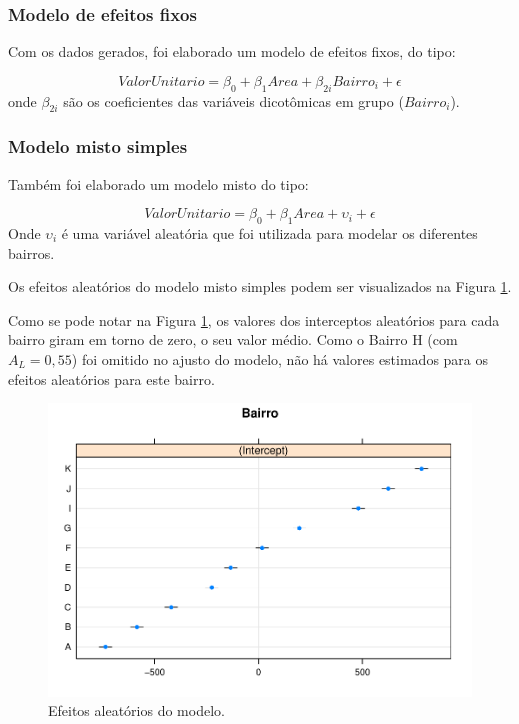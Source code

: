 \documentclass[
  a4paper, 12pt]{article}
\begin{document}
\hypertarget{modelo-de-efeitos-fixos}{%
\subsubsection{Modelo de efeitos fixos}\label{modelo-de-efeitos-fixos}}

Com os dados gerados, foi elaborado um modelo de efeitos fixos, do tipo:

\[ValorUnitario = \beta_0 + \beta_1Area + \beta_{2i}Bairro_i + \epsilon\]
onde \(\beta_{2i}\) são os coeficientes das variáveis dicotômicas em
grupo (\(Bairro_i\)).

\hypertarget{modelo-misto-simples}{%
\subsubsection{Modelo misto simples}\label{modelo-misto-simples}}

Também foi elaborado um modelo misto do tipo:

\[ValorUnitario = \beta_0 + \beta_1Area + \upsilon_i + \epsilon\] Onde
\(\upsilon_i\) é uma variável aleatória que foi utilizada para modelar
os diferentes bairros.

Os efeitos aleatórios do modelo misto simples podem ser visualizados na
Figura \ref{fig:dotplot}.

Como se pode notar na Figura \ref{fig:dotplot}, os valores dos
interceptos aleatórios para cada bairro giram em torno de zero, o seu
valor médio. Como o Bairro H (com \(A_L = 0,55\)) foi omitido no ajusto
do modelo, não há valores estimados para os efeitos aleatórios para este
bairro.

\begin{figure}[H]

{\centering \includegraphics[width=0.7\linewidth]{EstudoCaso_files/figure-latex/dotplot-1} 

}

\caption{Efeitos aleatórios do modelo.}\label{fig:dotplot}
\end{figure}
\end{document}
